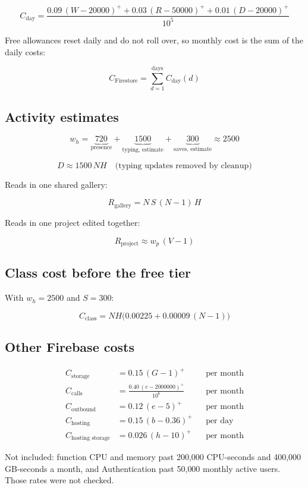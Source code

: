\documentclass{article}
\newcommand{\pos}[1]{\left(#1\right)^{+}}
\begin{document}
\[
C_{\text{day}} =
\frac{0.09\,\pos{W - 20000}
    + 0.03\,\pos{R - 50000}
    + 0.01\,\pos{D - 20000}}{10^{5}}
\]

Free allowances reset daily and do not roll over, so monthly cost is the sum
of the daily costs:

\[
C_{\text{Firestore}} = \sum_{d=1}^{\text{days}} C_{\text{day}}(d)
\]

\subsection{Activity estimates}

\[
w_h = \underbrace{720}_{\text{presence}}
    + \underbrace{1500}_{\text{typing, estimate}}
    + \underbrace{300}_{\text{saves, estimate}}
    \approx 2500
\]

\[
D \approx 1500\,N H \quad \text{(typing updates removed by cleanup)}
\]

Reads in one shared gallery:

\[
R_{\text{gallery}} = N\,S\,(N - 1)\,H
\]

Reads in one project edited together:

\[
R_{\text{project}} \approx w_p\,(V - 1)
\]

\subsection{Class cost before the free tier}

With $w_h = 2500$ and $S = 300$:

\[
C_{\text{class}} = N H \bigl(0.00225 + 0.00009\,(N - 1)\bigr)
\]

\subsection{Other Firebase costs}

\begin{align*}
C_{\text{storage}} &= 0.15\,\pos{G - 1} && \text{per month} \\
C_{\text{calls}} &= \frac{0.40\,\pos{c - 2000000}}{10^{6}} && \text{per month} \\
C_{\text{outbound}} &= 0.12\,\pos{e - 5} && \text{per month} \\
C_{\text{hosting}} &= 0.15\,\pos{b - 0.36} && \text{per day} \\
C_{\text{hosting storage}} &= 0.026\,\pos{h - 10} && \text{per month}
\end{align*}

Not included: function CPU and memory past 200{,}000 CPU-seconds and
400{,}000 GB-seconds a month, and Authentication past 50{,}000 monthly active
users. Those rates were not checked.
\end{document}
